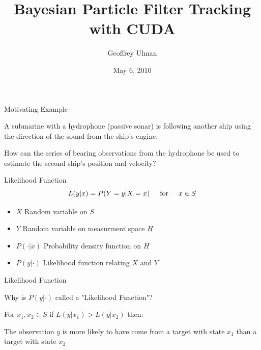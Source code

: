 \documentclass{beamer}
\title{Bayesian Particle Filter Tracking with CUDA}
\author{Geoffrey Ulman}
\date{May 6, 2010}
\begin{document}

\begin{frame}
\titlepage
\end{frame}


\begin{frame}{Motivating Example}

A submarine with a hydrophone (passive sonar) is following another
ship using the direction of the sound from the ship's engine.

\vspace{1cm}

How can the series of bearing observations from the hydrophone be
used to estimate the second ship's position and velocity?

\end{frame}


\begin{frame}{Likelihood Function}
\begin{equation}
L(y|x) = P( Y=y | X=x ) \hspace{0.5cm} \mbox{for} \hspace{0.5cm} x \in S
\end{equation}

\vspace{1cm}

\begin{itemize}
\item \(X\) Random variable on \(S\)
\item \(Y\) Random variable on measurment space \(H\)
\item \(P(\cdot|x)\) Probability density function on \(H\)
\item \(P(y|\cdot)\) Likelihood function relating \(X\) and \(Y\)
\end{itemize}

\end{frame}



\begin{frame}{Likelihood Function}

Why is \(P(y|\cdot)\) called a "Likelihood Function"?

\vspace{1cm}

For \hspace{0.25cm} \(x_{1}, x_{2} \in S \) \hspace{0.25cm} if \hspace{0.25cm} \(L(y|x_{1})>L(y|x_{2})\) \hspace{0.25cm} then:

\vspace{1cm}

The observation \(y\) is more likely to have come from a target with state \(x_{1}\) than a target with state \(x_{2}\)

\end{frame}
\end{document}
